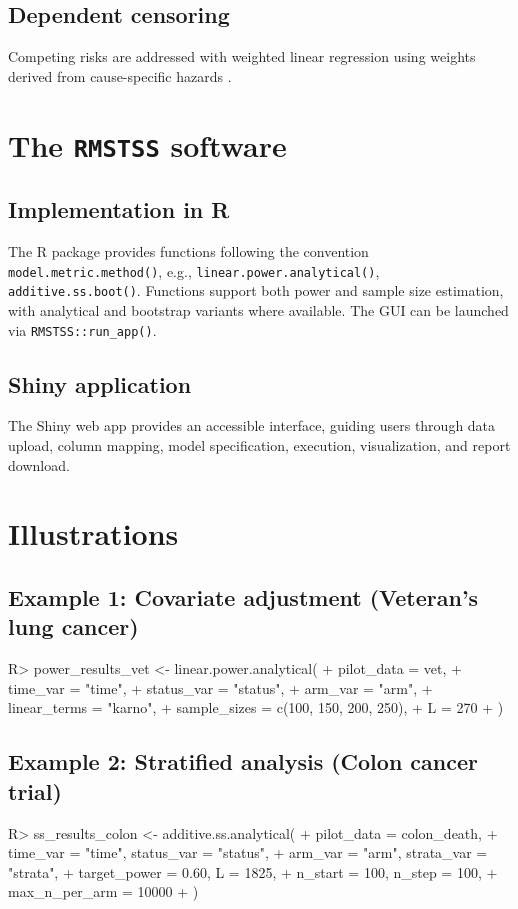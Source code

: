 \documentclass[article]{jss}
\begin{document}
\subsection{Dependent censoring}
Competing risks are addressed with weighted linear regression using weights derived from cause-specific hazards \citep{wang2018}.

\section{The \texttt{RMSTSS} software}

\subsection{Implementation in R}
The R package provides functions following the convention \texttt{model.metric.method()}, e.g., \texttt{linear.power.analytical()}, \texttt{additive.ss.boot()}. Functions support both power and sample size estimation, with analytical and bootstrap variants where available. The GUI can be launched via \texttt{RMSTSS::run\_app()}.

\subsection{Shiny application}
The Shiny web app provides an accessible interface, guiding users through data upload, column mapping, model specification, execution, visualization, and report download.

\section{Illustrations}

\subsection{Example 1: Covariate adjustment (Veteran's lung cancer)}
\begin{Code}
R> power_results_vet <- linear.power.analytical(
+   pilot_data = vet,
+   time_var = "time",
+   status_var = "status",
+   arm_var = "arm",
+   linear_terms = "karno",
+   sample_sizes = c(100, 150, 200, 250),
+   L = 270
+ )
\end{Code}

\subsection{Example 2: Stratified analysis (Colon cancer trial)}
\begin{Code}
R> ss_results_colon <- additive.ss.analytical(
+   pilot_data = colon_death,
+   time_var = "time", status_var = "status",
+   arm_var = "arm", strata_var = "strata",
+   target_power = 0.60, L = 1825,
+   n_start = 100, n_step = 100,
+   max_n_per_arm = 10000
+ )
\end{Code}
\end{document}
